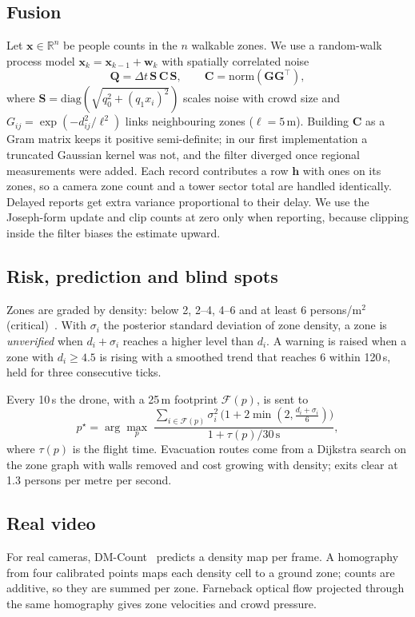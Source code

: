 \documentclass[10pt,twocolumn]{article}
\begin{document}
\subsection{Fusion}
Let $\mathbf{x}\in\mathbb{R}^n$ be people counts in the $n$ walkable zones. We use a random-walk process model $\mathbf{x}_k = \mathbf{x}_{k-1} + \mathbf{w}_k$ with spatially correlated noise
\begin{equation}
\mathbf{Q} = \Delta t\, \mathbf{S}\,\mathbf{C}\,\mathbf{S},\qquad \mathbf{C} = \mathrm{norm}(\mathbf{G}\mathbf{G}^\top),
\end{equation}
where $\mathbf{S}=\mathrm{diag}(\sqrt{q_0^2 + (q_1 x_i)^2})$ scales noise with crowd size and $G_{ij}=\exp(-d_{ij}^2/\ell^2)$ links neighbouring zones ($\ell=5$\,m). Building $\mathbf{C}$ as a Gram matrix keeps it positive semi-definite; in our first implementation a truncated Gaussian kernel was not, and the filter diverged once regional measurements were added. Each record contributes a row $\mathbf{h}$ with ones on its zones, so a camera zone count and a tower sector total are handled identically. Delayed reports get extra variance proportional to their delay. We use the Joseph-form update and clip counts at zero only when reporting, because clipping inside the filter biases the estimate upward.

\subsection{Risk, prediction and blind spots}
Zones are graded by density: below 2, 2--4, 4--6 and at least 6 persons/m$^2$ (critical)~\cite{fruin1971,still2014}. With $\sigma_i$ the posterior standard deviation of zone density, a zone is \emph{unverified} when $d_i+\sigma_i$ reaches a higher level than $d_i$. A warning is raised when a zone with $d_i\geq 4.5$ is rising with a smoothed trend that reaches 6 within 120\,s, held for three consecutive ticks.

Every 10\,s the drone, with a 25\,m footprint $\mathcal{F}(p)$, is sent to
\begin{equation}
p^\star = \arg\max_{p}\; \frac{\sum_{i\in\mathcal{F}(p)} \sigma_i^2\,\bigl(1 + 2\min(2, \tfrac{d_i+\sigma_i}{6})\bigr)}{1 + \tau(p)/30\,\mathrm{s}},
\end{equation}
where $\tau(p)$ is the flight time. Evacuation routes come from a Dijkstra search on the zone graph with walls removed and cost growing with density; exits clear at 1.3 persons per metre per second.

\subsection{Real video}
For real cameras, DM-Count~\cite{wang2020dmcount} predicts a density map per frame. A homography from four calibrated points maps each density cell to a ground zone; counts are additive, so they are summed per zone. Farneback optical flow projected through the same homography gives zone velocities and crowd pressure.
\end{document}
